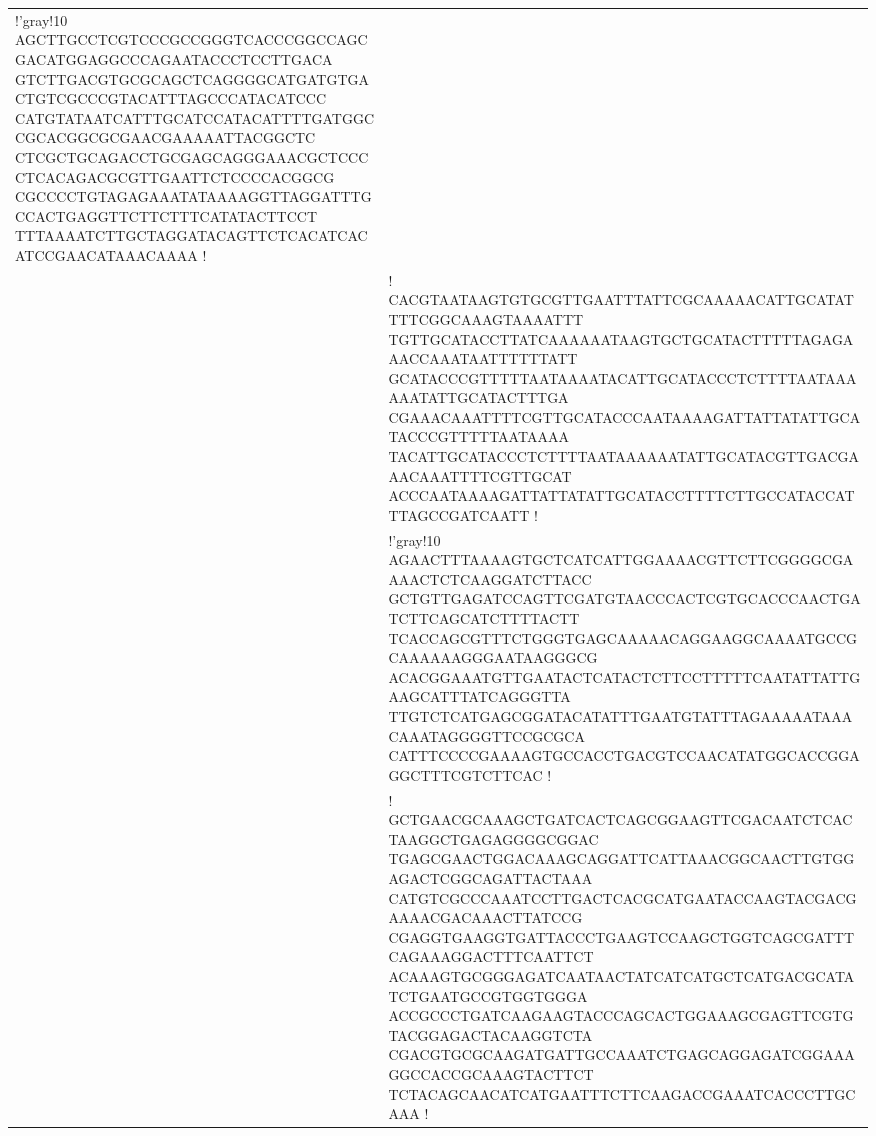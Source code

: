 \begin{xltabular}{\textwidth}{Xl}
		\begin{minipage}{.85\textwidth}
			\vspace*{4pt}
			\DNA!'{gray!10}
				AGCTTGCCTCGTCCCGCCGGGTCACCCGGCCAGCGACATGGAGGCCCAGAATACCCTCCTTGACA
				GTCTTGACGTGCGCAGCTCAGGGGCATGATGTGACTGTCGCCCGTACATTTAGCCCATACATCCC
				CATGTATAATCATTTGCATCCATACATTTTGATGGCCGCACGGCGCGAACGAAAAATTACGGCTC
				CTCGCTGCAGACCTGCGAGCAGGGAAACGCTCCCCTCACAGACGCGTTGAATTCTCCCCACGGCG
				CGCCCCTGTAGAGAAATATAAAAGGTTAGGATTTGCCACTGAGGTTCTTCTTTCATATACTTCCT
				TTTAAAATCTTGCTAGGATACAGTTCTCACATCACATCCGAACATAAACAAAA
			!
			\vspace*{4pt}
		\end{minipage}
	\\
	 & 
		\begin{minipage}{.85\textwidth}
			\vspace*{4pt}
			\DNA!
				CACGTAATAAGTGTGCGTTGAATTTATTCGCAAAAACATTGCATATTTTCGGCAAAGTAAAATTT
				TGTTGCATACCTTATCAAAAAATAAGTGCTGCATACTTTTTAGAGAAACCAAATAATTTTTTATT
				GCATACCCGTTTTTAATAAAATACATTGCATACCCTCTTTTAATAAAAAATATTGCATACTTTGA
				CGAAACAAATTTTCGTTGCATACCCAATAAAAGATTATTATATTGCATACCCGTTTTTAATAAAA
				TACATTGCATACCCTCTTTTAATAAAAAATATTGCATACGTTGACGAAACAAATTTTCGTTGCAT
				ACCCAATAAAAGATTATTATATTGCATACCTTTTCTTGCCATACCATTTAGCCGATCAATT
			!
			\vspace*{4pt}
		\end{minipage}
	\\
	 & 
		\begin{minipage}{.85\textwidth}
			\vspace*{4pt}
			\DNA!'{gray!10}
				AGAACTTTAAAAGTGCTCATCATTGGAAAACGTTCTTCGGGGCGAAAACTCTCAAGGATCTTACC
				GCTGTTGAGATCCAGTTCGATGTAACCCACTCGTGCACCCAACTGATCTTCAGCATCTTTTACTT
				TCACCAGCGTTTCTGGGTGAGCAAAAACAGGAAGGCAAAATGCCGCAAAAAAGGGAATAAGGGCG
				ACACGGAAATGTTGAATACTCATACTCTTCCTTTTTCAATATTATTGAAGCATTTATCAGGGTTA
				TTGTCTCATGAGCGGATACATATTTGAATGTATTTAGAAAAATAAACAAATAGGGGTTCCGCGCA
				CATTTCCCCGAAAAGTGCCACCTGACGTCCAACATATGGCACCGGAGGCTTTCGTCTTCAC
			!
			\vspace*{4pt}
		\end{minipage}
	\\
	 & 
		\begin{minipage}{.85\textwidth}
			\vspace*{4pt}
			\DNA!
				GCTGAACGCAAAGCTGATCACTCAGCGGAAGTTCGACAATCTCACTAAGGCTGAGAGGGGCGGAC
				TGAGCGAACTGGACAAAGCAGGATTCATTAAACGGCAACTTGTGGAGACTCGGCAGATTACTAAA
				CATGTCGCCCAAATCCTTGACTCACGCATGAATACCAAGTACGACGAAAACGACAAACTTATCCG
				CGAGGTGAAGGTGATTACCCTGAAGTCCAAGCTGGTCAGCGATTTCAGAAAGGACTTTCAATTCT
				ACAAAGTGCGGGAGATCAATAACTATCATCATGCTCATGACGCATATCTGAATGCCGTGGTGGGA
				ACCGCCCTGATCAAGAAGTACCCAGCACTGGAAAGCGAGTTCGTGTACGGAGACTACAAGGTCTA
				CGACGTGCGCAAGATGATTGCCAAATCTGAGCAGGAGATCGGAAAGGCCACCGCAAAGTACTTCT
				TCTACAGCAACATCATGAATTTCTTCAAGACCGAAATCACCCTTGCAAA
			!
			\vspace*{4pt}
		\end{minipage}
	\\
\end{xltabular}